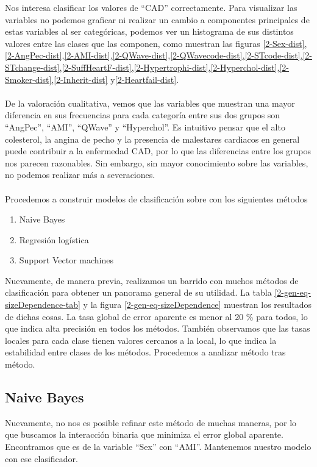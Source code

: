 \documentclass[11pt]{article}
\begin{document}
Nos interesa clasificar los valores de ``CAD'' correctamente. Para visualizar las variables no podemos graficar ni realizar un cambio a componentes principales de estas variables al ser categóricas, podemos ver un histograma de sus distintos valores entre las clases que las componen, como muestran las figuras \ref{2-Sex-dist},\ref{2-AngPec-dist},\ref{2-AMI-dist},\ref{2-QWave-dist},\ref{2-QWavecode-dist},\ref{2-STcode-dist},\ref{2-STchange-dist},\ref{2-SuffHeartF-dist},\ref{2-Hypertrophi-dist},\ref{2-Hyperchol-dist},\ref{2-Smoker-dist},\ref{2-Inherit-dist} y\ref{2-Heartfail-dist}.
\\
\\De la valoración cualitativa, vemos que las variables que muestran una mayor diferencia en sus frecuencias para cada categoría entre sus dos grupos son ``AngPec'', ``AMI'', ``QWave'' y  ``Hyperchol''. Es intuitivo pensar que el alto colesterol, la angina de pecho y la presencia de malestares cardiacos en general puede contribuir a la enfermedad CAD, por lo que las diferencias entre los grupos nos parecen razonables. Sin embargo, sin mayor conocimiento sobre las variables, no podemos realizar más a severaciones.
\\
\\Procedemos a construir modelos de clasificación sobre con los siguientes métodos
\begin{enumerate}[label=\alph*)]
    \item Naive Bayes
    \item Regresión logística
    \item Support Vector machines
\end{enumerate}
Nuevamente, de manera previa, realizamos un barrido con muchos métodos de clasificación para obtener un panorama general de su utilidad. La tabla \ref{2-gen-eq-sizeDependence-tab} y la figura \ref{2-gen-eq-sizeDependence} muestran los resultados de dichas cosas. La tasa global de error aparente es menor al 20 \% para todos, lo que indica alta precisión en todos los métodos. También observamos que las tasas locales para cada clase tienen valores cercanos a la local, lo que indica la estabilidad entre clases de los métodos. Procedemos a analizar método tras método.
\subsection{Naive Bayes}
Nuevamente, no nos es posible refinar este método de muchas maneras, por lo que buscamos la interacción binaria que minimiza el error global aparente. Encontramos que es de la variable ``Sex'' con ``AMI''. Mantenemos nuestro modelo con ese clasificador.
\end{document}

